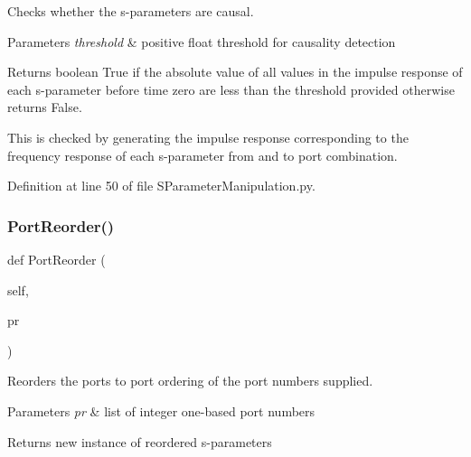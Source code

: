 Checks whether the s-\/parameters are causal. 


\begin{DoxyParams}{Parameters}
{\em threshold} & positive float threshold for causality detection \\
\hline
\end{DoxyParams}
\begin{DoxyReturn}{Returns}
boolean True if the absolute value of all values in the impulse response of each s-\/parameter before time zero are less than the threshold provided otherwise returns False.
\end{DoxyReturn}
This is checked by generating the impulse response corresponding to the frequency response of each s-\/parameter from and to port combination. 

Definition at line 50 of file S\+Parameter\+Manipulation.\+py.

\mbox{\label{classSignalIntegrity_1_1SParameters_1_1SParameterManipulation_1_1SParameterManipulation_a979f42e9c8bf72ce90999a24da8a839d}} 
\subsubsection{\texorpdfstring{Port\+Reorder()}{PortReorder()}}
{\footnotesize\ttfamily def Port\+Reorder (\begin{DoxyParamCaption}\item[{}]{self,  }\item[{}]{pr }\end{DoxyParamCaption})}



Reorders the ports to port ordering of the port numbers supplied. 


\begin{DoxyParams}{Parameters}
{\em pr} & list of integer one-\/based port numbers \\
\hline
\end{DoxyParams}
\begin{DoxyReturn}{Returns}
new instance of reordered s-\/parameters 
\end{DoxyReturn}


